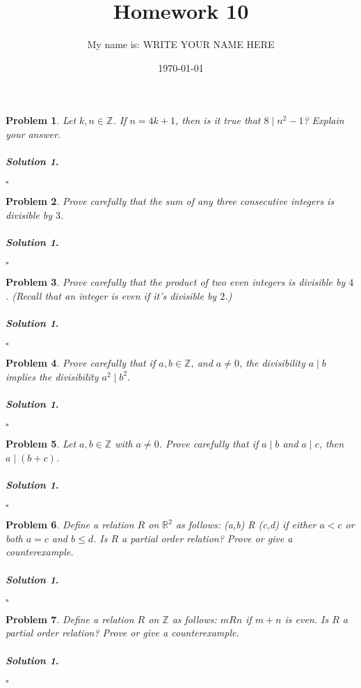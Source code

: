 \documentclass{amsart}
\theoremstyle{plain}
\newtheorem{problem}{Problem}
\newenvironment{solution}{\paragraph{\emph{Solution 1}.}}{\hfill$\square$}
\begin{document}
 

\title[Homework 10]{Homework 10}
\author{My name is:  WRITE YOUR NAME HERE}  %
\date{\today} 
\maketitle 

\begin{problem}
Let $k,n \in \mathbb{Z}$.  If $n = 4k + 1$, then is it true that $8 \mid n^{2} - 1$?  Explain your answer. 
\end{problem}
\begin{solution}
\end{solution}

\begin{problem}
Prove carefully that the sum of any three consecutive integers is divisible by $3$.
\end{problem}
\begin{solution}
\end{solution}

\begin{problem}
Prove carefully that the product of two even integers is divisible by $4$.  (Recall that an integer is even if it's divisible by $2$.)
\end{problem}
\begin{solution}
\end{solution}

\begin{problem}
Prove carefully that if $a,b \in \mathbb{Z}$, and $a \neq 0$, the divisibility $a \mid b$ implies the divisibility $a^{2} \mid b^{2}$. 
\end{problem}
\begin{solution}
\end{solution}


\begin{problem}
Let $a,b \in \mathbb{Z}$ with $a \neq 0$.  Prove carefully that if $a \mid b$ and $a \mid c$, then $a \mid (b+c)$.
\end{problem}
\begin{solution}
\end{solution}


\begin{problem}
Define a relation $R$ on $\mathbb{R}^{2}$ as follows:  (a,b) R (c,d) if either $a < c$ or both $a=c$ and $b \le d$.  Is $R$ a partial order relation?  Prove or give a counterexample.
\end{problem}
\begin{solution}
\end{solution}

\begin{problem}
Define a relation $R$ on $\mathbb{Z}$ as follows:  $m R n$ if $m + n$ is even.  Is $R$ a partial order relation?  Prove or give a counterexample.
\end{problem}
\begin{solution}
\end{solution}
\end{document}
